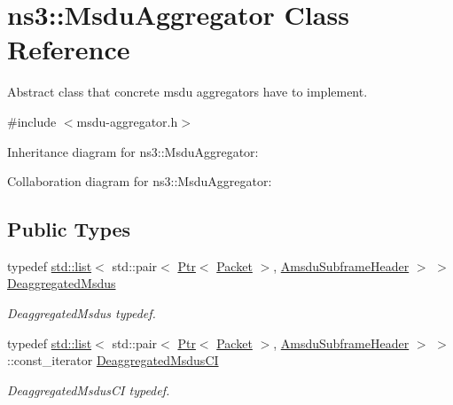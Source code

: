 \hypertarget{classns3_1_1MsduAggregator}{}\section{ns3\+:\+:Msdu\+Aggregator Class Reference}
\label{classns3_1_1MsduAggregator}


Abstract class that concrete msdu aggregators have to implement.  




{\ttfamily \#include $<$msdu-\/aggregator.\+h$>$}



Inheritance diagram for ns3\+:\+:Msdu\+Aggregator\+:


Collaboration diagram for ns3\+:\+:Msdu\+Aggregator\+:
\subsection*{Public Types}
\begin{DoxyCompactItemize}
\item 
typedef \hyperlink{openflow-interface_8h_afd9bcfa176617760671b67580f536fa7}{std\+::list}$<$ std\+::pair$<$ \hyperlink{classns3_1_1Ptr}{Ptr}$<$ \hyperlink{classns3_1_1Packet}{Packet} $>$, \hyperlink{classns3_1_1AmsduSubframeHeader}{Amsdu\+Subframe\+Header} $>$ $>$ \hyperlink{classns3_1_1MsduAggregator_a9ca3d84483249fae3dffc35bcc98bb11}{Deaggregated\+Msdus}
\begin{DoxyCompactList}\small\item\em Deaggregated\+Msdus typedef. \end{DoxyCompactList}\item 
typedef \hyperlink{openflow-interface_8h_afd9bcfa176617760671b67580f536fa7}{std\+::list}$<$ std\+::pair$<$ \hyperlink{classns3_1_1Ptr}{Ptr}$<$ \hyperlink{classns3_1_1Packet}{Packet} $>$, \hyperlink{classns3_1_1AmsduSubframeHeader}{Amsdu\+Subframe\+Header} $>$ $>$\+::const\+\_\+iterator \hyperlink{classns3_1_1MsduAggregator_a6cc0e0e5681fa47009e6ff74d15f1656}{Deaggregated\+Msdus\+CI}
\begin{DoxyCompactList}\small\item\em Deaggregated\+Msdus\+CI typedef. \end{DoxyCompactList}\end{DoxyCompactItemize}
